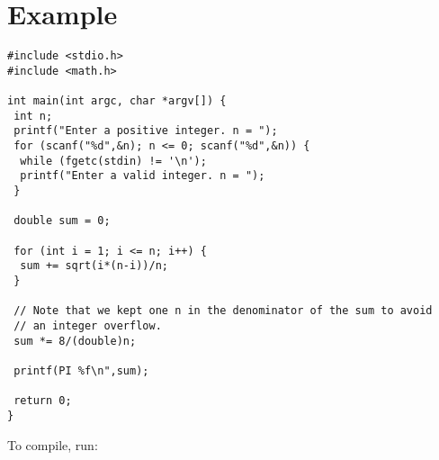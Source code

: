 \documentclass[12pt,a4paper]{article}
\begin{document}
\newpage
\section{Example}
\begin{lstlisting}[title=riesum.c]
#include <stdio.h>
#include <math.h>

int main(int argc, char *argv[]) {
 int n;
 printf("Enter a positive integer. n = ");
 for (scanf("%d",&n); n <= 0; scanf("%d",&n)) {
  while (fgetc(stdin) != '\n');
  printf("Enter a valid integer. n = ");
 }

 double sum = 0;

 for (int i = 1; i <= n; i++) {
  sum += sqrt(i*(n-i))/n;
 }

 // Note that we kept one n in the denominator of the sum to avoid
 // an integer overflow.
 sum *= 8/(double)n;

 printf(PI %f\n",sum);

 return 0;
}
\end{lstlisting}

To compile, run: \selectfont{gcc riesum.c -o riesum -lm}
\end{document}
